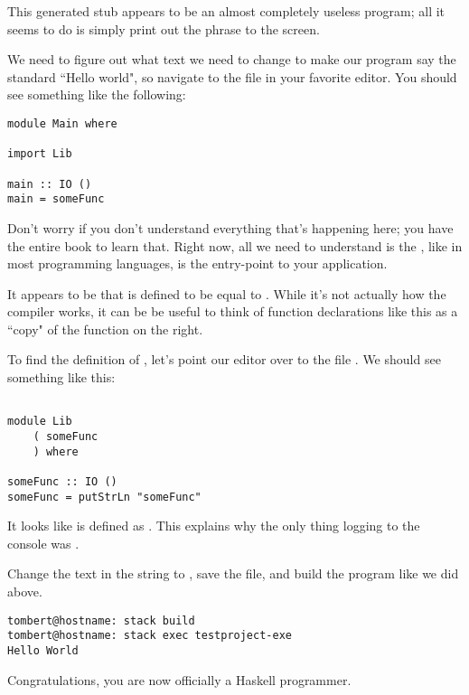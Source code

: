 This generated stub appears to be an almost completely useless program; all it seems to do is simply print out the phrase  to the screen. 

We need to figure out what text we need to change to make our program say the standard ``Hello world", so navigate to the  file in your favorite editor. You should see something like the following: 

\begin{verbatim}
module Main where

import Lib

main :: IO ()
main = someFunc
\end{verbatim}

Don't worry if you don't understand everything that's happening here; you have the entire book to learn that.  Right now, all we need to understand is the , like in most programming languages, is the entry-point to your application. 

It appears to be that  is defined to be equal to .  While it's not actually how the compiler works, it can be be useful to think of function declarations like this as a ``copy"  of the function on the right. 

To find the definition of , let's point our editor over to the file .  We should see something like this: 

\begin{verbatim}

module Lib
    ( someFunc
    ) where

someFunc :: IO ()
someFunc = putStrLn "someFunc"

\end{verbatim}

It looks like  is defined as .  This explains why the only thing logging to the console was .  

Change the text in the string to , save the file, and build the program like we did above.  

\begin{verbatim}
tombert@hostname: stack build
tombert@hostname: stack exec testproject-exe
Hello World
\end{verbatim}

Congratulations, you are now officially a Haskell programmer.  



